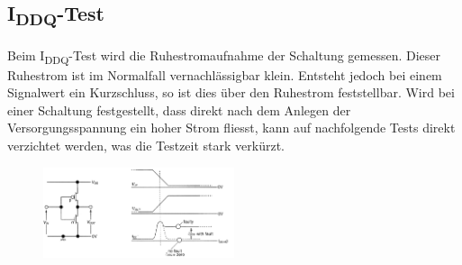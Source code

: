 \subsection{I\textsubscript{DDQ}-Test}
\begin{multicols}{2}
Beim I\textsubscript{DDQ}-Test wird die Ruhestromaufnahme der Schaltung gemessen. Dieser Ruhestrom ist im Normalfall vernachlässigbar klein. Entsteht jedoch bei einem Signalwert ein Kurzschluss, so ist dies über den Ruhestrom feststellbar. Wird bei einer Schaltung festgestellt, dass direkt nach dem Anlegen der Versorgungsspannung ein hoher Strom fliesst, kann auf nachfolgende Tests direkt verzichtet werden, was die Testzeit stark verkürzt.
\begin{figure}[H]
    \includegraphics[width=0.5\textwidth]{images/iddq.png}
\end{figure}
\end{multicols}

